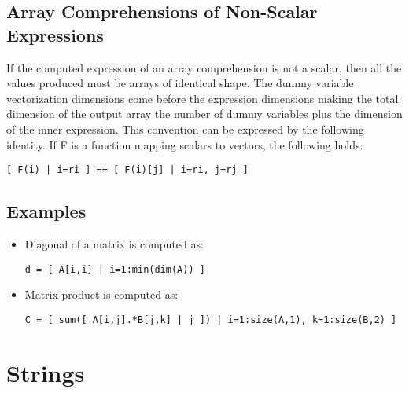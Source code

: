 \documentclass{article}
\renewcommand{\sec}[1]{\label{sec:#1}}
\begin{document}
\subsection{Array Comprehensions of Non-Scalar Expressions}
If the computed expression of an array comprehension is not a scalar,
then all the values produced must be arrays of identical shape. The
dummy variable vectorization dimensions come before the expression
dimensions making the total dimension of the output array the number
of dummy variables plus the dimension of the inner expression. This
convention can be expressed by the following identity. If F is a
function mapping scalars to vectors, the following holds:
\begin{verbatim}
[ F(i) | i=ri ] == [ F(i)[j] | i=ri, j=rj ]
\end{verbatim}

\subsection{Examples}

\begin{itemize}
\item Diagonal of a matrix is computed as:
\begin{verbatim}
d = [ A[i,i] | i=1:min(dim(A)) ]
\end{verbatim}
\item Matrix product is computed as:
\begin{verbatim}
C = [ sum([ A[i,j].*B[j,k] | j ]) | i=1:size(A,1), k=1:size(B,2) ]
\end{verbatim}


\end{itemize}

\section{Strings}
\sec{strings}
\end{document}

